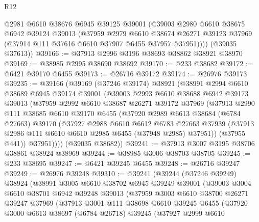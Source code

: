 \begin{lexlean}{R12}
\begin{coremodule}
        @2981
        @6610
        @38676
        @6945
        @39125
        @39001
        (@39003
          @2980
          @6610
          @38675
          @6942
          @39124
          @39013
          (@37959
            @2979
            @6610
            @38674
            @26271
            @39123
            @37969
            (@37914 @111 @37616 @6610 @37907 @6455 @37957 @37951))))
      (@39035 @37613))
@39166 := @37913 @2996 @3196 @38693 @38862 @38921 @38970
@39169 := @38985 @2995 @38690 @38692
@39170 := @233 @38682
@39172 := @6421 @39170 @6455
@39173 := @26716 @39172
@39174 := @26976 @39173
@39235 := @39166
    (@39169
      (@37246 @39174)
      @38921
      (@38991
        @2994
        @6610
        @38689
        @6945
        @39174
        @39001
        (@39003
          @2993
          @6610
          @38688
          @6942
          @39173
          @39013
          (@37959
            @2992
            @6610
            @38687
            @26271
            @39172
            @37969
            (@37913
              @2990
              @111
              @38685
              @6610
              @39170
              @6455
              (@37920
                @2989
                @6613
                @38684
                (@6784 @27663)
                @39170
                (@37927
                  @2988
                  @6610
                  @6612
                  @6783
                  @27663
                  @37939
                  (@37913 @2986 @111 @6610 @6610 @2985 @6455 (@37948 @2985) @37951))
                (@37955 @441))
              @37951))))
      (@39035 @38682))
@39241 := @37913 @3007 @3195 @38706 @38861 @38924 @38969
@39244 := @38985 @3006 @38703 @38705
@39245 := @233 @38695
@39247 := @6421 @39245 @6455
@39248 := @26716 @39247
@39249 := @26976 @39248
@39310 := @39241
    (@39244
      (@37246 @39249)
      @38924
      (@38991
        @3005
        @6610
        @38702
        @6945
        @39249
        @39001
        (@39003
          @3004
          @6610
          @38701
          @6942
          @39248
          @39013
          (@37959
            @3003
            @6610
            @38700
            @26271
            @39247
            @37969
            (@37913
              @3001
              @111
              @38698
              @6610
              @39245
              @6455
              (@37920
                @3000
                @6613
                @38697
                (@6784 @26718)
                @39245
                (@37927
                  @2999
                  @6610

\end{coremodule}
\end{lexlean}

